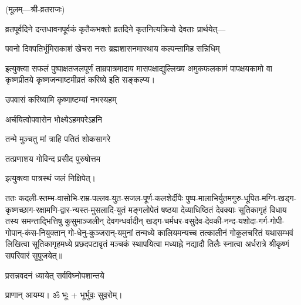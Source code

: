 
\centerline{\small{(मूलम्—श्री-व्रतराजः)}}
\setlength{\parindent}{0pt}

व्रतपूर्वदिने दन्तधावनपूर्वकं कृतैकभक्तो व्रतदिने कृतनित्यक्रियो देवताः प्रार्थयेत्—

{पवनो दिक्पतिर्भूमिराकाशं खेचरा नराः}
{ब्रह्मशासनमास्थाय कल्पन्तामिह सन्निधिम्}

इत्युक्त्वा सफलं पुष्पाक्षतजलपूर्णं ताम्रपात्रमादाय मासपक्षाद्युल्लिख्य अमुकफलकामं पापक्षयकामो वा 
कृष्णप्रीतये कृष्णजन्माष्टमीव्रतं करिष्ये इति सङ्कल्प्य।

{उपवासं करिष्यामि कृष्णाष्टम्यां नभस्यहम्}

{अर्चयित्वोपवासेन भोक्ष्येऽहमपरेऽहनि}

{तन्मे मुञ्चतु मां त्राहि पतितं शोकसागरे}

{तत्प्रणाशय गोविन्द प्रसीद पुरुषोत्तम}

इत्युक्त्वा पात्रस्थं जलं निक्षिपेत्।

ततः कदली-स्तम्भ-वासोभि-राम्र-पल्लव-युत-सजल-पूर्ण-कलशेर्दीपैः पुष्प-मालाभिर्\-युतमगुरु-धूपित-मग्नि-खड्ग-कृष्णच्छाग-रक्षामणि-द्वार-न्यस्त-मुसलादि-युतं मङ्गलोपेतं षष्ठया देव्याधिष्ठितं देवक्याः
सूतिकागृहं विधाय तस्य समन्ताद्भित्तिषु कुसुमाञ्जलीन् देवगन्धर्वादीन् खड्ग-चर्मधर-वसुदेव-देवकी-नन्द-यशोदा-गर्ग-गोपी-गोपान्-कंस-नियुक्तान्
गो-धेनु-कुञ्जरान्-यमुनां तन्मध्ये कालियमन्यच्च तत्कालीनं गोकुलचरितं 
यथासम्भवं लिखित्वा सूतिकागृहमध्ये प्रछदपटावृतं मञ्चकं स्थापयित्वा
मध्याह्ने नद्यादौ तिलैः स्नात्वा अर्धरात्रे श्रीकृष्णं सपरिवारं सुपूजयेत्॥






{प्रसन्नवदनं ध्यायेत् सर्वविघ्नोपशान्तये}

प्राणान्  आयम्य।  ॐ भूः + भूर्भुवः॒ सुव॒रोम्।

\setlength{\parindent}{30pt}


